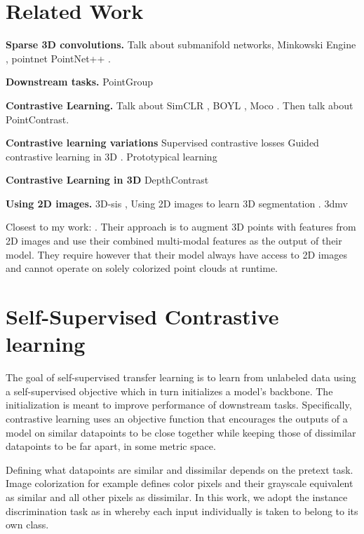 \documentclass[10pt,twocolumn,letterpaper]{article}
\begin{document}
\section{Related Work}
\label{sec:relatedWork}


\textbf{Sparse 3D convolutions.} Talk about submanifold networks, Minkowski Engine \cite{choy20194d}, pointnet \cite{charles2017PointNet} PointNet++ \cite{qi2017pointnet++}.

\textbf{Downstream tasks.} PointGroup \cite{}

\textbf{Contrastive Learning.} Talk about SimCLR \cite{chen_simple_2020}, BOYL \cite{grill_bootstrap_nodate}, Moco \cite{he_momentum_2020}. Then talk about PointContrast. \cite{choy2019Fully}

\textbf{Contrastive learning variations}
Supervised contrastive losses \cite{khosla_supervised_2021} Guided contrastive learning in 3D \cite{jiang2021Guided}. Prototypical learning \cite{li_prototypical_2021}

\textbf{Contrastive Learning in 3D}
DepthContrast \cite{zhang2021Self}

\textbf{Using 2D images.} 3D-sis \cite{hou20193d}, Using 2D images to learn 3D segmentation \cite{genova2021learning} \cite{frey_continual_2021}. 3dmv \cite{angela2018joint}

Closest to my work: \cite{yunze2020p4contrast}. Their approach is to augment 3D points with features from 2D images and use their combined multi-modal features as the output of their model. They require however that their model always have access to 2D images and cannot operate on solely colorized point clouds at runtime.

\section{Self-Supervised Contrastive learning}
\label{sec:contrastiveLearning}

The goal of self-supervised transfer learning is to learn from unlabeled data using a self-supervised objective which in turn initializes a model's backbone. The initialization is meant to improve performance of downstream tasks. Specifically, contrastive learning uses an objective function that encourages the outputs of a model on similar datapoints to be close together while keeping those of dissimilar datapoints to be far apart, in some metric space.

Defining what datapoints are similar and dissimilar depends on the pretext task. Image colorization for example defines color pixels and their grayscale equivalent as similar and all other pixels as dissimilar. In this work, we adopt the instance discrimination task as in \cite{} whereby each input individually is taken to belong to its own class.
\end{document}
